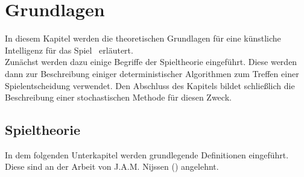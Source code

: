 \chapter{Grundlagen}
\label{basics}
\authorpatrick
In diesem Kapitel werden die theoretischen Grundlagen für eine künstliche Intelligenz für das Spiel \ot\ erläutert.\\
Zunächst werden dazu einige Begriffe der Spieltheorie eingeführt. Diese werden dann zur Beschreibung einiger deterministischer Algorithmen zum Treffen einer Spielentscheidung verwendet. Den Abschluss des Kapitels bildet schließlich die Beschreibung einer stochastischen Methode für diesen Zweck. 
\section{Spieltheorie}
In dem folgenden Unterkapitel werden grundlegende Definitionen eingeführt. Diese sind an der Arbeit  von J.A.M. Nijssen (\cite{Russell.2016}) angelehnt.
